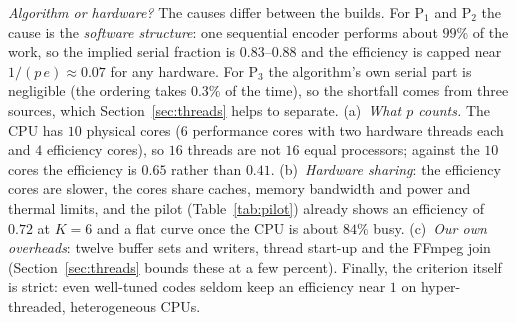 \documentclass[conference]{IEEEtran}
\begin{document}
\emph{Algorithm or hardware?} The causes differ between the builds. For P$_1$ and P$_2$ the cause is the \emph{software structure}: one sequential encoder performs about $99\%$ of the work, so the implied serial fraction is $0.83$--$0.88$ and the efficiency is capped near $1/(p\,e)\approx0.07$ for any hardware. For P$_3$ the algorithm's own serial part is negligible (the ordering takes $0.3\%$ of the time), so the shortfall comes from three sources, which Section~\ref{sec:threads} helps to separate. (a)~\emph{What $p$ counts.} The CPU has $10$ physical cores ($6$ performance cores with two hardware threads each and $4$ efficiency cores), so $16$ threads are not $16$ equal processors; against the $10$ cores the efficiency is $0.65$ rather than $0.41$. (b)~\emph{Hardware sharing}: the efficiency cores are slower, the cores share caches, memory bandwidth and power and thermal limits, and the pilot (Table~\ref{tab:pilot}) already shows an efficiency of $0.72$ at $K{=}6$ and a flat curve once the CPU is about $84\%$ busy. (c)~\emph{Our own overheads}: twelve buffer sets and writers, thread start-up and the FFmpeg join (Section~\ref{sec:threads} bounds these at a few percent). Finally, the criterion itself is strict: even well-tuned codes seldom keep an efficiency near $1$ on hyper-threaded, heterogeneous CPUs.
\end{document}
